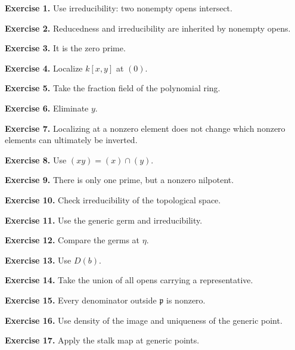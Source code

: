 \noindent\textbf{Exercise 1.} Use irreducibility: two nonempty opens intersect.\par

\noindent\textbf{Exercise 2.} Reducedness and irreducibility are inherited by nonempty opens.\par

\noindent\textbf{Exercise 3.} It is the zero prime.\par

\noindent\textbf{Exercise 4.} Localize $k[x,y]$ at $(0)$.\par

\noindent\textbf{Exercise 5.} Take the fraction field of the polynomial ring.\par

\noindent\textbf{Exercise 6.} Eliminate $y$.\par

\noindent\textbf{Exercise 7.} Localizing at a nonzero element does not change which nonzero elements can ultimately be inverted.\par

\noindent\textbf{Exercise 8.} Use $(xy)=(x)\cap(y)$.\par

\noindent\textbf{Exercise 9.} There is only one prime, but a nonzero nilpotent.\par

\noindent\textbf{Exercise 10.} Check irreducibility of the topological space.\par

\noindent\textbf{Exercise 11.} Use the generic germ and irreducibility.\par

\noindent\textbf{Exercise 12.} Compare the germs at $\eta$.\par

\noindent\textbf{Exercise 13.} Use $D(b)$.\par

\noindent\textbf{Exercise 14.} Take the union of all opens carrying a representative.\par

\noindent\textbf{Exercise 15.} Every denominator outside $\mathfrak p$ is nonzero.\par

\noindent\textbf{Exercise 16.} Use density of the image and uniqueness of the generic point.\par

\noindent\textbf{Exercise 17.} Apply the stalk map at generic points.\par

